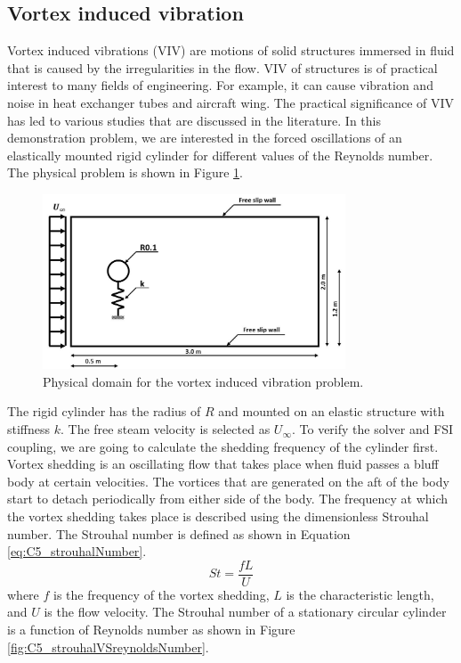 \subsection{Vortex induced vibration}
Vortex induced vibrations (VIV) are motions of solid structures immersed in fluid that is caused by the irregularities in the flow. VIV of structures is of practical interest to many fields of engineering. For example, it can cause vibration and noise in heat exchanger tubes and aircraft wing. The practical significance of VIV has led to various studies that are discussed in the literature\cite{williamson2004vortex}. In this demonstration problem, we are interested in the forced oscillations of an elastically mounted rigid cylinder for different values of the Reynolds number. The physical problem is shown in Figure \ref{fig:C5_cylinderShape}.
%
\begin{figure}[H]
    \centering
    \includegraphics[width=9.00cm]{Chapter_5/figure/VIV_domain_shape.jpg}
    \caption{Physical domain for the vortex induced vibration problem.}
    \label{fig:C5_cylinderShape}
\end{figure}
%
The rigid cylinder has the radius of $R$ and mounted on an elastic structure with stiffness $k$. The free steam velocity is selected as $U_\infty$. To verify the solver and FSI coupling, we are going to calculate the shedding frequency of the cylinder first. Vortex shedding is an oscillating flow that takes place when fluid passes a bluff body at certain velocities. The vortices that are generated on the aft of the body start to detach periodically from either side of the body. The frequency at which the vortex shedding takes place is described using the dimensionless Strouhal number. The Strouhal number is defined as shown in Equation \eqref{eq:C5_strouhalNumber}.
%
\begin{equation}\label{eq:C5_strouhalNumber}
	St = \frac{fL}{U}
\end{equation}
%
where $f$ is the frequency of the vortex shedding, $L$ is the characteristic length, and $U$ is the flow velocity. The Strouhal number of a stationary circular cylinder is a function of Reynolds number \cite{chen1987flow} as shown in Figure \ref{fig:C5_strouhalVSreynoldsNumber}\cite{jendrzejczyk1985fluid}.
